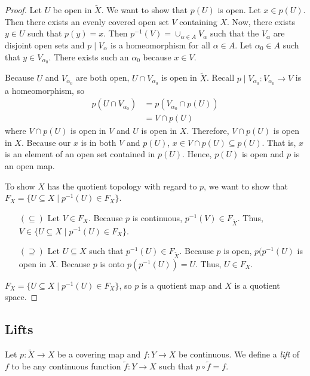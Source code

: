 \begin{proof}  Let $U$ be open in $\tilde{X}$.  We want to show that $p(U)$ is open.  Let $x \in p(U).$  Then there exists an evenly covered open set $V$ containing $X$.  Now, there exists $y \in U$ such that $p(y)=x.$  Then $p^{-1}(V)=\cup_{\alpha \in A}V_{\alpha}$ such that the $V_{\alpha}$ are disjoint open sets and $p \mid V_{\alpha}$ is a homeomorphism for all $\alpha \in A$.  Let $\alpha_0 \in A$ such that $y \in V_{\alpha_0}$.  There exists such an $\alpha_0$ because $x \in V$.

Because $U$ and $V_{\alpha_0}$ are both open, $U\cap V_{\alpha_0}$ is open in $\widetilde{X}$. Recall $p\mid V_{\alpha_0}:V_{\alpha_0}\rightarrow V$ is a homeomorphism, so 
\begin{align*}
p(U\cap V_{\alpha_0})&=p\left(V_{\alpha_0}\cap p(U)\right)\\
&=V\cap p(U)
\end{align*}
where $V\cap p(U)$ is open in $V$ and $U$ is open in $X$. Therefore, $V\cap p(U)$ is open in $X$. Because our $x$ is in both $V$ and $p(U)$, $x\in V\cap p(U)\subseteq p(U)$. That is, $x$ is an element of an open set contained in $p(U)$. Hence, $p(U)$ is open and $p$ is an open map.
\item To show $X$ has the quotient topology with regard to $p$, we want to show that $F_X = \{U\subseteq X \mid p^{-1}(U)\in F_X\}$.

\begin{itemize}
\item[$(\subseteq)$] Let $V\in F_X$. Because $p$ is continuous, $p^{-1}(V)\in F_{\widetilde{X}}$. Thus, $V\in \{U\subseteq X \mid p^{-1}(U)\in F_X\}$.

\item[$(\supseteq)$] Let $U\subseteq X$ such that $p^{-1}(U)\in F_{\widetilde{X}}$. Because $p$ is open, $p(p^{-1}(U)$ is open in $X$. Because $p$ is onto $p(p^{-1}(U))=U$. Thus, $U\in F_X$.
\end{itemize}

$F_X = \{U\subseteq X \mid p^{-1}(U)\in F_X\}$, so $p$ is a quotient map and $X$ is a quotient space. 

\end{proof}

\newpage
\subsection{Lifts}
\begin{definition}
Let $p:\widetilde{X}\rightarrow X$ be a covering map and $f:Y\rightarrow X$ be continuous. We define a \textit{lift} of $f$ to be any continuous function $\widetilde{f}:Y\rightarrow X$ such that $p\circ \widetilde{f}=f$.
\end{definition}


